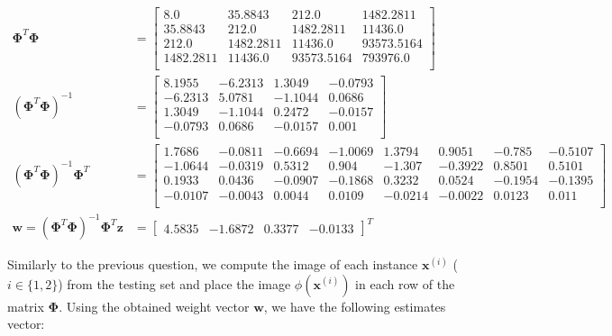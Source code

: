 \documentclass{exam}
\begin{document}
\begin{questions}
        \begin{align*}
            \boldsymbol{\Phi}^T\boldsymbol{\Phi} &= 
            \begin{bmatrix}
                8.0 & 35.8843 & 212.0 & 1482.2811 \\
                35.8843 & 212.0 & 1482.2811 & 11436.0 \\
                212.0 & 1482.2811 & 11436.0 & 93573.5164 \\
                1482.2811 & 11436.0 & 93573.5164 & 793976.0 \\
            \end{bmatrix} \\
            (\boldsymbol{\Phi}^T\boldsymbol{\Phi})^{-1} &= 
            \begin{bmatrix}
                8.1955 & -6.2313 & 1.3049 & -0.0793 \\
                -6.2313 & 5.0781 & -1.1044 & 0.0686 \\
                1.3049 & -1.1044 & 0.2472 & -0.0157 \\
                -0.0793 & 0.0686 & -0.0157 & 0.001 \\
            \end{bmatrix} \\
            (\boldsymbol{\Phi}^T\boldsymbol{\Phi})^{-1}\boldsymbol{\Phi}^T&=
            \begin{bmatrix}
                1.7686 & -0.0811 & -0.6694 & -1.0069 & 1.3794 & 0.9051 & -0.785 & -0.5107 \\
                -1.0644 & -0.0319 & 0.5312 & 0.904 & -1.307 & -0.3922 & 0.8501 & 0.5101 \\
                0.1933 & 0.0436 & -0.0907 & -0.1868 & 0.3232 & 0.0524 & -0.1954 & -0.1395 \\
                -0.0107 & -0.0043 & 0.0044 & 0.0109 & -0.0214 & -0.0022 & 0.0123 & 0.011 \\               
            \end{bmatrix} \\
            \textbf{w} = (\boldsymbol{\Phi}^T\boldsymbol{\Phi})^{-1}\boldsymbol{\Phi}^T\textbf{z} &= 
            \begin{bmatrix}
                4.5835 & -1.6872 & 0.3377 & -0.0133
            \end{bmatrix} ^T
        \end{align*}
        \item Similarly to the previous question, we compute the image of each instance $\textbf{x}^{(i)}$ ($i \in \{1,2\}$) from the testing set and place the image $\phi(\textbf{x}^{(i)})$ in each row of the matrix $\boldsymbol{\Phi}$. Using the obtained weight vector $\textbf{w}$, we have the following estimates vector:

\end{questions}
\end{document}
